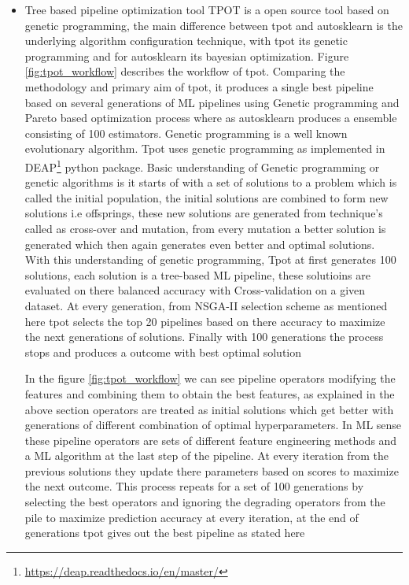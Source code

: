\begin{itemize}
    \begin{itemize}
        \item Tree based pipeline optimization tool TPOT\cite{tpot} is a open source tool based on genetic programming, the main difference between tpot and autosklearn is the underlying algorithm configuration technique, with tpot its genetic programming and for autosklearn its bayesian optimization. Figure \ref{fig:tpot_workflow} describes the workflow of tpot. Comparing the methodology and primary aim of tpot, it produces a single best pipeline based on several generations of ML pipelines using Genetic programming and Pareto based optimization process where as autosklearn produces a ensemble consisting of 100 estimators.
        Genetic programming is a well known evolutionary algorithm. Tpot uses genetic programming as implemented in DEAP\footnote{\url{https://deap.readthedocs.io/en/master/}} python package. Basic understanding of Genetic programming or genetic algorithms is  it starts of with a set of solutions to a problem which is called the initial population, the initial solutions are combined to form new solutions i.e offsprings, these new solutions are generated from technique's called as cross-over and mutation, from every mutation a better solution is generated which then again generates even better and optimal solutions. With this understanding of genetic programming, Tpot at first generates 100 solutions, each solution is a tree-based ML pipeline, these solutioins are evaluated on there balanced accuracy with Cross-validation on a given dataset. At every generation, from NSGA-II selection scheme as mentioned here\cite{tpot} tpot selects the top 20 pipelines based on there accuracy to maximize the next generations of solutions. Finally with 100 generations the process stops and produces a outcome with best optimal solution 
        
        In the figure \ref{fig:tpot_workflow} we can see pipeline operators modifying the features and combining them to obtain the best features, as explained in the above section operators are treated as initial solutions which get better with generations of different combination of optimal hyperparameters. In ML sense these pipeline operators are sets of different feature engineering methods and a ML algorithm at the last step of the pipeline. At every iteration from the previous solutions they update there parameters based on scores to maximize the next outcome. This process repeats for a set of 100 generations by selecting the best operators and ignoring the degrading operators from the pile to maximize prediction accuracy at every iteration, at the end of generations tpot gives out the best pipeline as stated here \cite{tpot}
        

\end{itemize}
\end{itemize}

